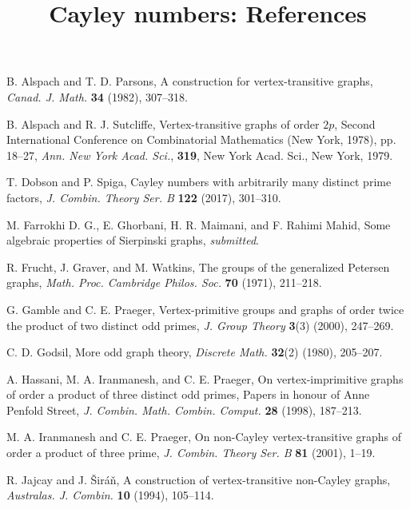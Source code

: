 \documentclass{amsart}
\begin{document}
\title{Cayley numbers: References}
\maketitle
\begin{thebibliography}{0}
B. Alspach and T. D. Parsons, A construction for vertex-transitive graphs, \textit{Canad. J. Math.} \textbf{34} (1982), 307--318.

B. Alspach and R. J. Sutcliffe, Vertex-transitive graphs of order $2p$, Second International Conference on Combinatorial Mathematics (New York, 1978), pp. 18--27, \textit{Ann. New York Acad. Sci.}, \textbf{319}, New York Acad. Sci., New York, 1979.

T. Dobson and P. Spiga, Cayley numbers with arbitrarily many distinct prime factors, \textit{J. Combin. Theory Ser. B} \textbf{122} (2017), 301--310.

M. Farrokhi D. G., E. Ghorbani, H. R. Maimani, and F. Rahimi Mahid, Some algebraic properties of Sierpinski graphs, \textit{submitted}.

R. Frucht, J. Graver, and M. Watkins, The groups of the generalized Petersen graphs, \textit{Math. Proc. Cambridge Philos. Soc.} \textbf{70} (1971), 211--218.

G. Gamble and C. E. Praeger, Vertex-primitive groups and graphs of order twice the product of two distinct odd primes, \textit{J. Group Theory} \textbf{3}(3) (2000), 247--269.

C. D. Godsil, More odd graph theory, \textit{Discrete Math.} \textbf{32}(2) (1980), 205--207.

A. Hassani, M. A. Iranmanesh, and C. E. Praeger, On vertex-imprimitive graphs of order a product of three distinct odd primes, Papers in honour of Anne Penfold Street, \textit{J. Combin. Math. Combin. Comput.} \textbf{28} (1998), 187--213.

M. A. Iranmanesh and C. E. Praeger, On non-Cayley vertex-transitive graphs of order a product of three prime, \textit{J. Combin. Theory Ser. B} \textbf{81} (2001), 1--19.

R. Jajcay and J. \v{S}ir\'{a}\v{n}, A construction of vertex-transitive non-Cayley graphs, \textit{Australas. J. Combin.} \textbf{10} (1994), 105--114. 


\end{thebibliography}
\end{document}

